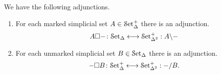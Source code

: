 \documentclass[main.tex]{subfiles}
\begin{document}
\begin{proposition}
  \label{prop:marked_box_adjunctions}
  We have the following adjunctions.
  \begin{enumerate}
    \item For each marked simplicial set $A \in \mathcal{S}\mathrm{et}_{\Delta}^{+}$ there is an adjunction.
      \begin{equation*}
        A \square -\colon \mathcal{S}\mathrm{et}_{\Delta} \longleftrightarrow \mathcal{S}\mathrm{et}_{\Delta^{2}}^{+} : A \backslash -
      \end{equation*}

    \item For each unmarked simplicial set $B \in \mathcal{S}\mathrm{et}_{\Delta}$ there is an adjunction.
      \begin{equation*}
        - \square B\colon \mathcal{S}\mathrm{et}_{\Delta}^{+} \longleftrightarrow \mathcal{S}\mathrm{et}_{\Delta^{2}}^{+} : - / B.
      \end{equation*}
  \end{enumerate}
\end{proposition}
\end{document}
